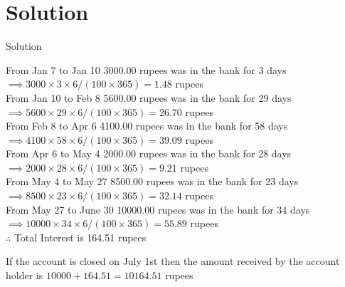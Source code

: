 \documentclass{beamer}
\begin{document}
	\section{Solution}
	\begin{frame}{Solution}
	

From Jan 7 to Jan 10 3000.00 rupees was in the  bank for 3 days $\implies 3000\times3\times6/(100\times365)=1.48$ rupees\\
From Jan 10 to Feb 8 5600.00 rupees was in the  bank for 29 days $\implies 5600\times29\times6/(100\times365)=26.70$ rupees \\
From Feb 8 to Apr 6 4100.00 rupees was in the  bank for 58 days $\implies 4100\times58\times6/(100\times365)=39.09$ rupees\\ 
From Apr 6 to May 4 2000.00 rupees was in the  bank for 28 days $\implies 2000\times28\times6/(100\times365)=9.21$ rupees\\
From May 4 to May 27 8500.00 rupees was in the  bank for 23 days $\implies 8500\times23\times6/(100\times365)=32.14$ rupees\\
From May 27 to June 30 10000.00 rupees was in the  bank for 34 days $\implies 10000\times34\times6/(100\times365)=55.89$ rupees\\
$\therefore$ Total Interest is 164.51 rupees\\
\end{frame}

\begin{frame}
 If the account is closed on July 1st then the amount received by the account holder is $ 10000 + 164.51 =10164.51$ rupees \\



\end{frame}
	
\end{document}
